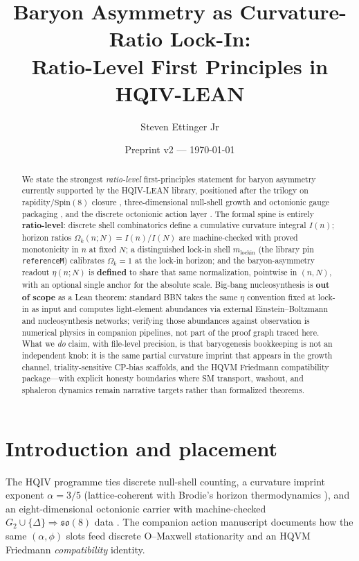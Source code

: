 \documentclass[11pt]{amsart}
\title[Baryon asymmetry as curvature-ratio lock-in]{Baryon Asymmetry as Curvature-Ratio Lock-In:\\
Ratio-Level First Principles in HQIV-LEAN}
\author{Steven Ettinger Jr}
\date{Preprint v2 --- \today}
\begin{document}
\begin{abstract}
We state the strongest \emph{ratio-level} first-principles statement for baryon asymmetry currently supported by the HQIV-LEAN library, positioned after the trilogy on rapidity/\(\mathrm{Spin}(8)\) closure \cite{hqiv-so8-paper}, three-dimensional null-shell growth and octonionic gauge packaging \cite{hqiv-3d-growth-paper}, and the discrete octonionic action layer \cite{hqiv-oct-action-paper}.
The formal spine is entirely \textbf{ratio-level}: discrete shell combinatorics define a cumulative curvature integral \(I(n)\); horizon ratios \(\Omega_k(n;N)=I(n)/I(N)\) are machine-checked with proved monotonicity in \(n\) at fixed \(N\); a distinguished lock-in shell \(m_{\mathrm{lockin}}\) (the library pin \texttt{referenceM}) calibrates \(\Omega_k=1\) at the lock-in horizon; and the baryon-asymmetry readout \(\eta(n;N)\) is \textbf{defined} to share that same normalization, pointwise in \((n,N)\), with an optional single anchor for the absolute scale.
Big-bang nucleosynthesis is \textbf{out of scope} as a Lean theorem: standard BBN takes the same \(\eta\) convention fixed at lock-in as input and computes light-element abundances via external Einstein--Boltzmann and nucleosynthesis networks; verifying those abundances against observation is numerical physics in companion pipelines, not part of the proof graph traced here.
What we \emph{do} claim, with file-level precision, is that baryogenesis bookkeeping is not an independent knob: it is the same partial curvature imprint that appears in the growth channel, triality-sensitive CP-bias scaffolds, and the HQVM Friedmann compatibility package---with explicit honesty boundaries where SM transport, washout, and sphaleron dynamics remain narrative targets rather than formalized theorems.
\end{abstract}
\maketitle



\section{Introduction and placement}

The HQIV programme ties discrete null-shell counting, a curvature imprint exponent \(\alpha=3/5\) (lattice-coherent with Brodie's horizon thermodynamics \cite{brodie2026}), and an eight-dimensional octonionic carrier with machine-checked \(G_2\cup\{\Delta\}\Rightarrow\mathfrak{so}(8)\) data \cite{hqiv-so8-paper,hqiv-3d-growth-paper}.
The companion action manuscript \cite{hqiv-oct-action-paper} documents how the same \((\alpha,\phi)\) slots feed discrete O--Maxwell stationarity and an HQVM Friedmann \emph{compatibility} identity.
\end{document}
